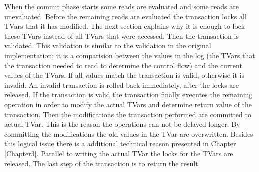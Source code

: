 When the commit phase starts some reads are evaluated and some reads are unevaluated. Before the remaining
reads are evaluated the transaction locks all TVars that it has modified. The next section explains why it 
is enough to lock these TVars instead of all TVars that were accessed. Then the transaction is validated.
This validation is similar to the validation in the original implementation; it is a comparision between
the values in the log (the TVars that the transaction needed to read to determine the control flow) and
the current values of the TVars. If all values match the transaction is valid, otherwise it is invalid.
An invalid transaction is rolled back immediately, after the locks are released. If the transaction is
valid the transaction finally executes the remaining  operation in order to modify the 
actual TVars and determine return value of the transaction. Then the modifications the transaction 
performed are committed to actual TVar. This is the reason the  operations can not 
be delayed longer. By committing the modifications the old values in the TVar are overwritten. Besides 
this logical issue there is a additional technical reason presented in Chapter \ref{Chapter3}.
Parallel to writing the actual TVar the locks for the TVars are released. The last step of the transaction 
is to return the result. 

